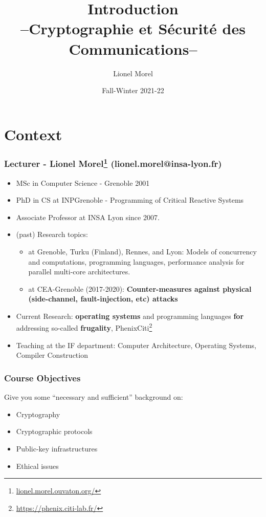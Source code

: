 \documentclass[
hyperref={pdfpagelabels=false}
,xcolor=table
]
{beamer}
\title[CSC - Intro]{Introduction \\ --Cryptographie et Sécurité des Communications--}
\author[]{Lionel Morel}
\institute[]{Telecommunications - INSA Lyon}
\date{Fall-Winter 2021-22}
\begin{document}
\begin{frame}
  \maketitle
\end{frame}

\section{Context}

\begin{frame}
  \frametitle{Lecturer - Lionel Morel\footnote{\url{lionel.morel.ouvaton.org/}} (lionel.morel@insa-lyon.fr)}
  \begin{itemize}
  \item MSc in Computer Science - Grenoble 2001
  \item PhD in CS at INPGrenoble - Programming of Critical Reactive Systems
  \item Associate Professor at INSA Lyon since 2007. 
  \item (past) Research topics:
    \begin{itemize}
    \item at Grenoble, Turku (Finland), Rennes, and Lyon: Models of
      concurrency and computations, programming languages, performance
      analysis for parallel multi-core architectures.
    \item at CEA-Grenoble (2017-2020): \textbf{Counter-measures
        against physical (side-channel, fault-injection, etc) attacks}
    \end{itemize}
  \item Current Research: \textbf{operating systems} and programming
    languages \textbf{for} addressing so-called \textbf{frugality}, Phenix\@ Citi\footnote{\url{https://phenix.citi-lab.fr/}}
  \item Teaching at the IF department: Computer Architecture,
    Operating Systems, Compiler Construction
  \end{itemize}
\end{frame}



\begin{frame}
  \frametitle{Course Objectives}
  Give you some ``necessary and sufficient'' background on:
  \begin{itemize}
  \item Cryptography
  \item Cryptographic protocols
  \item Public-key infrastructures
  \item Ethical issues
  \end{itemize}
\end{frame}
\end{document}
